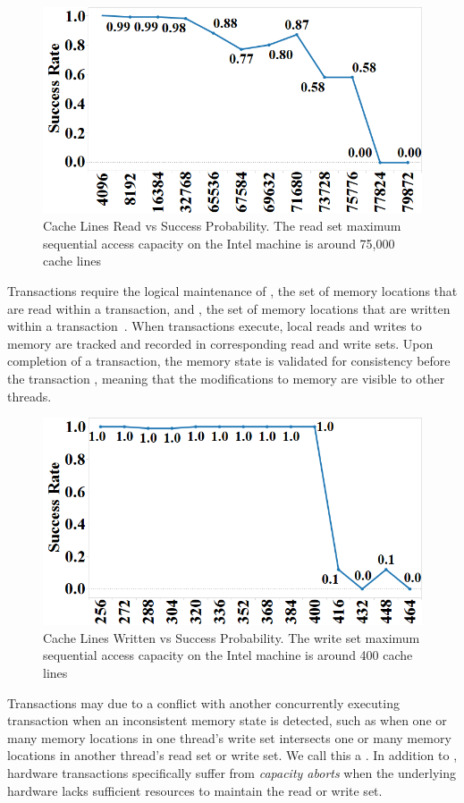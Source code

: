 \begin{figure}[H]%
\centering
\includegraphics[width=.45\linewidth]{images/wttm_capacity_read_intel}
\caption{Cache Lines Read vs Success Probability. The read set maximum
sequential access capacity on the Intel machine is around 75,000 cache lines}
\label{fig:wttm_capacity_read_intel}
\end{figure}

Transactions require the logical 
maintenance of , the set
of memory locations that are read within a 
transaction, and , the set
of memory locations that are written within 
a transaction~\cite{HerlihyMo93}. When transactions execute, 
local reads and writes to memory 
are tracked and recorded in
corresponding read and write sets. Upon 
completion of a transaction, the memory state is validated for 
consistency before the transaction
, meaning that the modifications to 
memory are visible to other threads.


\begin{figure}[H]%
\centering
\includegraphics[width=.45\linewidth]{images/wttm_capacity_write_intel}
\caption{Cache Lines Written vs Success Probability. 
The write set maximum sequential access capacity on the Intel machine is
around 400 cache lines}
\label{fig:wttm_capacity_write_intel}
\end{figure}

Transactions may  due to a conflict with
another concurrently executing transaction when an
inconsistent memory state is detected, 
such as when one or many memory locations
in one thread's write set intersects one or 
many memory locations in another
thread's read set or write set.  We call this a
.  In addition to ,
hardware transactions specifically suffer 
from \textit{capacity aborts} when the underlying hardware
lacks sufficient resources to maintain the
read or write set.

